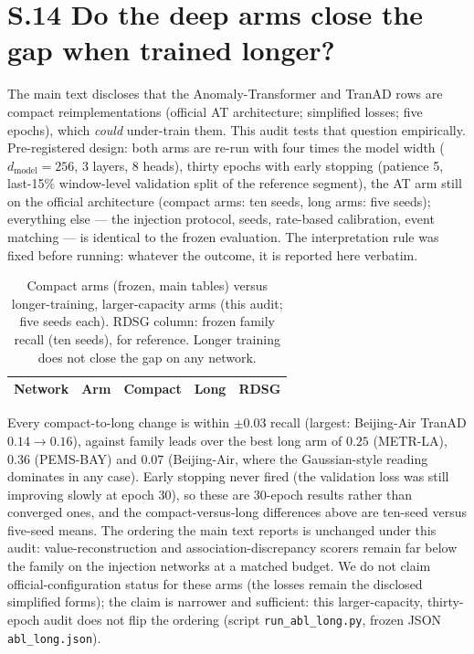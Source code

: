 \documentclass[11pt,a4paper]{article}
\begin{document}
\clearpage
\section*{S.14 Do the deep arms close the gap when trained longer?}

The main text discloses that the Anomaly-Transformer and TranAD rows are
compact reimplementations (official AT architecture; simplified losses; five epochs), which \emph{could} under-train them. This audit
tests that question empirically. Pre-registered design: both arms are
re-run with four times the model width ($d_{\mathrm{model}}{=}256$,
3 layers, 8 heads), thirty epochs with early stopping (patience 5,
last-15\% window-level validation split of the reference segment), the
AT arm still on the official architecture (compact arms: ten seeds,
long arms: five seeds); everything else --- the injection protocol,
seeds, rate-based calibration, event matching ---
is identical to the frozen evaluation. The interpretation rule was fixed
before running: whatever the outcome, it is reported here verbatim.

\begin{table}[h]\centering\small
\caption{Compact arms (frozen, main tables) versus longer-training,
larger-capacity arms (this audit; five seeds each). RDSG column: frozen
family recall (ten seeds), for reference. Longer training does not
close the gap on any network.}
\label{tab:s14}
\begin{tabular}{@{}llccc@{}}
\toprule
Network & Arm & Compact & Long & RDSG \\
\midrule

\end{tabular}
\end{table}

Every compact-to-long change is within $\pm 0.03$ recall (largest:
Beijing-Air TranAD $0.14\to 0.16$), against family leads over the best long
arm of $0.25$ (METR-LA), $0.36$ (PEMS-BAY) and $0.07$ (Beijing-Air,
where the Gaussian-style reading dominates in any case). Early stopping never fired (the validation
loss was still improving slowly at epoch 30), so these are 30-epoch
results rather than converged ones, and the compact-versus-long
differences above are ten-seed versus five-seed means. The ordering
the main text reports is unchanged under this audit:
value-reconstruction and association-discrepancy scorers remain far
below the family on the injection networks at a matched budget. We do not claim official-configuration
status for these arms (the losses remain the disclosed simplified
forms); the claim is narrower and sufficient: this larger-capacity,
thirty-epoch audit does not flip the ordering (script \texttt{run\_abl\_long.py}, frozen JSON
\texttt{abl\_long.json}).
\end{document}
